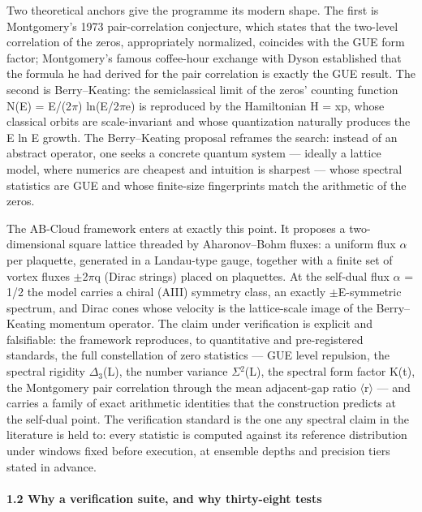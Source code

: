 \documentclass[10pt]{article}
\begin{document}
Two theoretical anchors give the programme its modern shape. The first is Montgomery's 1973 pair-correlation conjecture, which states that the two-level correlation of the zeros, appropriately normalized, coincides with the GUE form factor; Montgomery's famous coffee-hour exchange with Dyson established that the formula he had derived for the pair correlation is exactly the GUE result. The second is Berry--Keating: the semiclassical limit of the zeros' counting function N(E) = E/(2$\pi$) ln(E/2$\pi$e) is reproduced by the Hamiltonian H = xp, whose classical orbits are scale-invariant and whose quantization naturally produces the E ln E growth. The Berry--Keating proposal reframes the search: instead of an abstract operator, one seeks a concrete quantum system --- ideally a lattice model, where numerics are cheapest and intuition is sharpest --- whose spectral statistics are GUE and whose finite-size fingerprints match the arithmetic of the zeros.

The AB-Cloud framework enters at exactly this point. It proposes a two-dimensional square lattice threaded by Aharonov--Bohm fluxes: a uniform flux $\alpha$ per plaquette, generated in a Landau-type gauge, together with a finite set of vortex fluxes $\pm$2$\pi$q (Dirac strings) placed on plaquettes. At the self-dual flux $\alpha$ = 1/2 the model carries a chiral (AIII) symmetry class, an exactly $\pm$E-symmetric spectrum, and Dirac cones whose velocity is the lattice-scale image of the Berry--Keating momentum operator. The claim under verification is explicit and falsifiable: the framework reproduces, to quantitative and pre-registered standards, the full constellation of zero statistics --- GUE level repulsion, the spectral rigidity $\Delta$$_3$(L), the number variance $\Sigma$$^2$(L), the spectral form factor K(t), the Montgomery pair correlation through the mean adjacent-gap ratio $\langle$r$\rangle$ --- and carries a family of exact arithmetic identities that the construction predicts at the self-dual point. The verification standard is the one any spectral claim in the literature is held to: every statistic is computed against its reference distribution under windows fixed before execution, at ensemble depths and precision tiers stated in advance.

\paragraph{1.2 Why a verification suite, and why thirty-eight tests}
\end{document}
